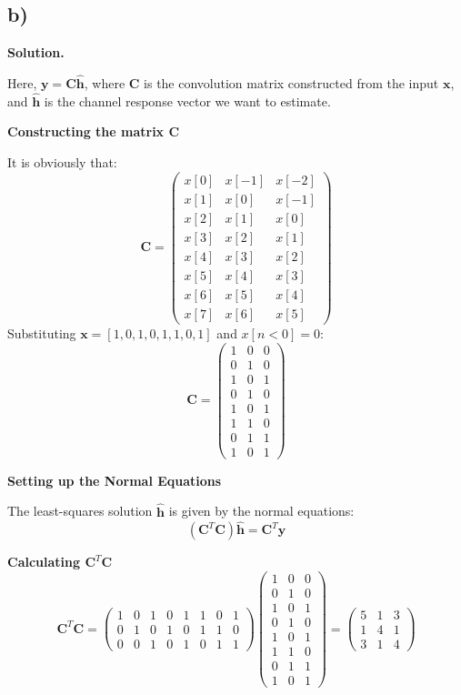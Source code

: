 \documentclass{article}
\newcommand{\0}{{\mathbf{0}}} %
\newcommand{\vect}[1]{\mathbf{#1}}
\begin{document}
\subsection*{b)}

\textbf{Solution.}

Here, $\vect{y} = \mathbf{C}\hat{\vect{h}}$, where $\mathbf{C}$ is the convolution matrix constructed from the input $\vect{x}$, and $\hat{\vect{h}}$ is the channel response vector we want to estimate.

\textbf{Constructing the matrix $\mathbf{C}$}

It is obviously that:
\[
\mathbf{C} =
\begin{pmatrix}
x[0] & x[-1] & x[-2] \\
x[1] & x[0] & x[-1] \\
x[2] & x[1] & x[0] \\
x[3] & x[2] & x[1] \\
x[4] & x[3] & x[2] \\
x[5] & x[4] & x[3] \\
x[6] & x[5] & x[4] \\
x[7] & x[6] & x[5]
\end{pmatrix}
\]
Substituting $\vect{x} = [ 1, 0, 1, 0, 1, 1, 0, 1]$ and $x[n<0]=0$:
\[
\mathbf{C} =
\begin{pmatrix}
1 & 0 & 0 \\
0 & 1 & 0 \\
1 & 0 & 1 \\
0 & 1 & 0 \\
1 & 0 & 1 \\
1 & 1 & 0 \\
0 & 1 & 1 \\
1 & 0 & 1
\end{pmatrix}
\]

\textbf{Setting up the Normal Equations}

The least-squares solution $\hat{\vect{h}}$ is given by the normal equations:
\[
(\mathbf{C}^T \mathbf{C}) \hat{\vect{h}} = \mathbf{C}^T \vect{y}
\]

\textbf{Calculating $\mathbf{C}^T \mathbf{C}$}
\[
\mathbf{C}^T \mathbf{C} =
\begin{pmatrix}
1 & 0 & 1 & 0 & 1 & 1 & 0 & 1 \\
0 & 1 & 0 & 1 & 0 & 1 & 1 & 0 \\
0 & 0 & 1 & 0 & 1 & 0 & 1 & 1
\end{pmatrix}
\begin{pmatrix}
1 & 0 & 0 \\
0 & 1 & 0 \\
1 & 0 & 1 \\
0 & 1 & 0 \\
1 & 0 & 1 \\
1 & 1 & 0 \\
0 & 1 & 1 \\
1 & 0 & 1
\end{pmatrix}
=
\begin{pmatrix}
5 & 1 & 3 \\
1 & 4 & 1 \\
3 & 1 & 4
\end{pmatrix}
\]
\end{document}
